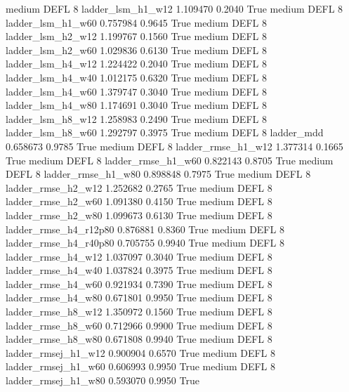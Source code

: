     medium     DEFL                 8      ladder_lsm_h1_w12   1.109470      0.2040    True
    medium     DEFL                 8      ladder_lsm_h1_w60   0.757984      0.9645    True
    medium     DEFL                 8      ladder_lsm_h2_w12   1.199767      0.1560    True
    medium     DEFL                 8      ladder_lsm_h2_w60   1.029836      0.6130    True
    medium     DEFL                 8      ladder_lsm_h4_w12   1.224422      0.2040    True
    medium     DEFL                 8      ladder_lsm_h4_w40   1.012175      0.6320    True
    medium     DEFL                 8      ladder_lsm_h4_w60   1.379747      0.3040    True
    medium     DEFL                 8      ladder_lsm_h4_w80   1.174691      0.3040    True
    medium     DEFL                 8      ladder_lsm_h8_w12   1.258983      0.2490    True
    medium     DEFL                 8      ladder_lsm_h8_w60   1.292797      0.3975    True
    medium     DEFL                 8             ladder_mdd   0.658673      0.9785    True
    medium     DEFL                 8     ladder_rmse_h1_w12   1.377314      0.1665    True
    medium     DEFL                 8     ladder_rmse_h1_w60   0.822143      0.8705    True
    medium     DEFL                 8     ladder_rmse_h1_w80   0.898848      0.7975    True
    medium     DEFL                 8     ladder_rmse_h2_w12   1.252682      0.2765    True
    medium     DEFL                 8     ladder_rmse_h2_w60   1.091380      0.4150    True
    medium     DEFL                 8     ladder_rmse_h2_w80   1.099673      0.6130    True
    medium     DEFL                 8  ladder_rmse_h4_r12p80   0.876881      0.8360    True
    medium     DEFL                 8  ladder_rmse_h4_r40p80   0.705755      0.9940    True
    medium     DEFL                 8     ladder_rmse_h4_w12   1.037097      0.3040    True
    medium     DEFL                 8     ladder_rmse_h4_w40   1.037824      0.3975    True
    medium     DEFL                 8     ladder_rmse_h4_w60   0.921934      0.7390    True
    medium     DEFL                 8     ladder_rmse_h4_w80   0.671801      0.9950    True
    medium     DEFL                 8     ladder_rmse_h8_w12   1.350972      0.1560    True
    medium     DEFL                 8     ladder_rmse_h8_w60   0.712966      0.9900    True
    medium     DEFL                 8     ladder_rmse_h8_w80   0.671808      0.9940    True
    medium     DEFL                 8    ladder_rmsej_h1_w12   0.900904      0.6570    True
    medium     DEFL                 8    ladder_rmsej_h1_w60   0.606993      0.9950    True
    medium     DEFL                 8    ladder_rmsej_h1_w80   0.593070      0.9950    True
